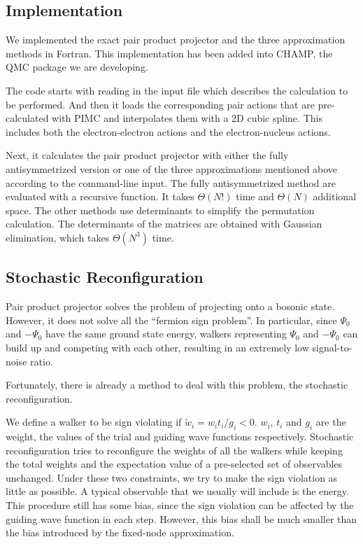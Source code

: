 \documentclass[aps,prl,reprint,groupedaddress]{revtex4-1}
\begin{document}
\subsection{Implementation}

We implemented the exact pair product projector and the three approximation methods in Fortran.
This implementation has been added into CHAMP, the QMC package we are developing.

The code starts with reading in the input file which describes the calculation to be performed.
And then it loads the corresponding pair actions that are pre-calculated with PIMC and interpolates them with a 2D cubic spline.
This includes both the electron-electron actions and the electron-nucleus actions.

Next, it calculates the pair product projector with either the fully antisymmetrized version or one of the three approximations mentioned above according to the command-line input.
The fully antisymmetrized method are evaluated with a recursive function.
It takes $\Theta(N!)$ time and $\Theta(N)$ additional space.
The other methods use determinants to simplify the permutation calculation.
The determinants of the matrices are obtained with Gaussian elimination, which takes $\Theta(N^3)$ time.

\subsection{Stochastic Reconfiguration}

Pair product projector solves the problem of projecting onto a bosonic state.
However, it does not solve all the ``fermion sign problem''.
In particular, since $\Psi_0$ and $-\Psi_0$ have the same ground state energy, walkers representing $\Psi_0$ and $-\Psi_0$ can build up and competing with each other, resulting in an extremely low signal-to-noise ratio.

Fortunately, there is already a method to deal with this problem, the stochastic reconfiguration.

We define a walker to be sign violating if $\widetilde{w}_i = w_it_i/g_i < 0$.
$w_i$, $t_i$ and $g_i$ are the weight, the values of the trial and guiding wave functions respectively.
Stochastic reconfiguration tries to reconfigure the weights of all the walkers while keeping the total weights and the expectation value of a pre-selected set of observables unchanged.
Under these two constraints, we try to make the sign violation as little as possible.
A typical observable that we usually will include is the energy.
This procedure still has some bias, since the sign violation can be affected by the guiding wave function in each step.
However, this bias shall be much smaller than the bias introduced by the fixed-node approximation.
\end{document}
